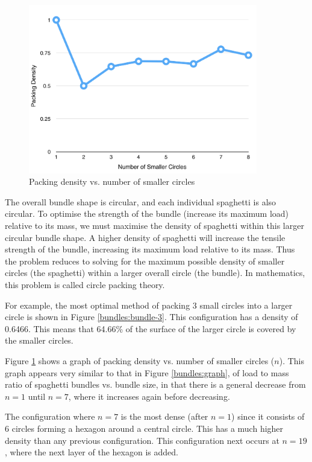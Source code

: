 \documentclass[a4paper,11pt]{article}
\begin{document}
\begin{figure}
\begin{center}
\includegraphics[width=10cm]{figures/density.png}
\end{center}
\caption{Packing density vs. number of smaller circles}
\label{bundles:density}
\end{figure}

The overall bundle shape is circular, and each individual spaghetti is also
circular.
To optimise the strength of the bundle (increase its maximum load) relative to
its mass, we must maximise the density of spaghetti within this larger circular
bundle shape.
A higher density of spaghetti will increase the tensile strength of the bundle,
increasing its maximum load relative to its mass.
Thus the problem reduces to solving for the maximum possible density of
smaller circles (the spaghetti) within a larger overall circle (the bundle).
In mathematics, this problem is called circle packing theory.

For example, the most optimal method of packing 3 small circles into a larger
circle is shown in Figure \ref{bundles:bundle-3}.
This configuration has a density of 0.6466.
This means that 64.66\% of the surface of the larger circle is covered by the
smaller circles.

Figure \ref{bundles:density} shows a graph of packing density vs. number of
smaller circles ($n$).
This graph appears very similar to that in Figure \ref{bundles:graph}, of load
to mass ratio of spaghetti bundles vs. bundle size, in that there is a general
decrease from $n = 1$ until $n = 7$, where it increases again before decreasing.

The configuration where $n = 7$ is the most dense (after $n = 1$) since it
consists of 6 circles forming a hexagon around a central circle.
This has a much higher density than any previous configuration.
This configuration next occurs at $n = 19$, where the next layer of the hexagon
is added.
\end{document}
